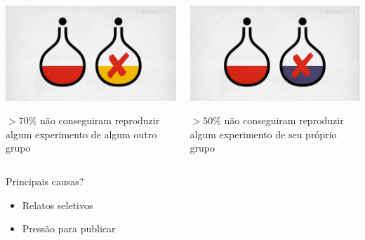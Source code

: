 \documentclass{beamer}
\begin{document}
\begin{frame}
  \begin{center}

    \begin{columns}
      \begin{column}{5cm}
        \includegraphics[width=\textwidth]{Imagens/reprod-nature1}

$>70\%$ não conseguiram reproduzir algum experimento de algum outro grupo
      \end{column}
      \begin{column}{5cm}
        \includegraphics[width=\textwidth]{Imagens/reprod-nature2}

$>50\%$ não conseguiram reproduzir algum experimento de seu próprio grupo
      \end{column}
    \end{columns}
  \end{center}
\end{frame}

\begin{frame}
  \begin{block}{Principais causas?}
    \begin{itemize}
    \item Relatos seletivos
    \item Pressão para publicar
    \end{itemize}
  \end{block}
\end{frame}
\end{document}
